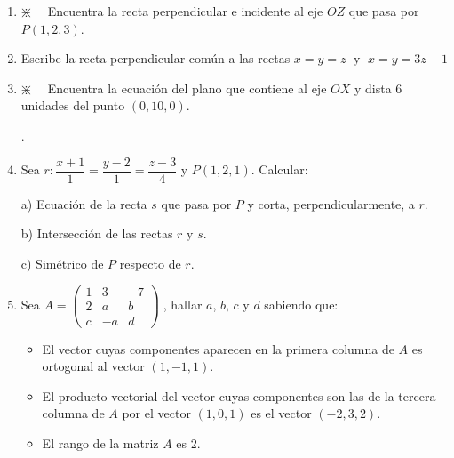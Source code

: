 \begin{enumerate}
\vspace{2mm} 

\item $\divideontimes\quad$ Encuentra la recta perpendicular e incidente al eje $OZ$ que pasa por $P(1,2,3)$.

\vspace{2mm} 

\item Escribe la recta perpendicular común a las rectas $x=y=z\;$ y $\; x=y=3z-1$

\vspace{2mm} 

\item $\divideontimes\quad$ Encuentra la ecuación del plano que contiene al eje $OX$ y dista $6$ unidades del punto $(0,10,0)$.

.

\vspace{2mm} 

\item Sea $r:\dfrac{x+1}{1}=\dfrac{y-2}{1}=\dfrac{z-3}{4}$ y $P(1,2,1)$. Calcular:

a) Ecuación de la recta $s$ que pasa por $P$ y corta, perpendicularmente, a $r$.

b) Intersección de las rectas $r$ y $s$.

c) Simétrico de $P$ respecto de $r$.

\vspace{2mm} 

\vspace{-2mm} 

\item Sea $A=\left( \begin{matrix} 1&3&-7\\2&a&b\\c&-a&d \end{matrix} \right)\;$, hallar $a$, $b$, $c$ y $d$ sabiendo que:
\begin{itemize}
\item El vector cuyas componentes aparecen en la primera columna de $A$ es ortogonal al vector $(1,-1,1)$.
\item El producto vectorial del vector cuyas componentes son las de la tercera columna de $A$ por el vector $(1,0,1)$ es el vector $(-2,3,2)$.
\item El rango de la matriz $A$ es $2$.
\end{itemize}


\end{enumerate}
